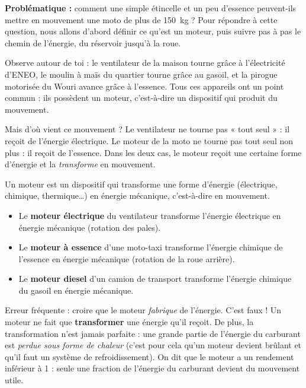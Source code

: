 \documentclass[11pt]{article}
\newcommand{\cle}[1]{{\popxbold\color{popdark}#1}}
\newcounter{popsec}
\newcounter{popsub}
\newcommand{\courssub}[1]{%
  \stepcounter{popsub}%
  \par\vspace{9pt}\noindent{\popxbold\fontsize{11.5}{13}\selectfont\color{popink}{\color{poporange}\thepopsec.\thepopsub}\hspace{6pt}#1}\par\nopagebreak\vspace{4pt}
}
\begin{document}
\textbf{Problématique :} comment une simple étincelle et un peu d'essence peuvent-ils mettre en mouvement une moto de plus de \SI{150}{kg} ? Pour répondre à cette question, nous allons d'abord définir ce qu'est un moteur, puis suivre pas à pas le chemin de l'énergie, du réservoir jusqu'à la roue.

\courssub{Qu'est-ce qu'un moteur ?}

Observe autour de toi : le ventilateur de la maison tourne grâce à l'électricité d'ENEO, le moulin à maïs du quartier tourne grâce au gasoil, et la pirogue motorisée du Wouri avance grâce à l'essence. Tous ces appareils ont un point commun : ils possèdent un \cle{moteur}, c'est-à-dire un dispositif qui produit du mouvement.

Mais d'où vient ce mouvement ? Le ventilateur ne tourne pas « tout seul » : il reçoit de l'énergie électrique. Le moteur de la moto ne tourne pas tout seul non plus : il reçoit de l'essence. Dans les deux cas, le moteur reçoit une certaine forme d'énergie et la \emph{transforme} en mouvement.

\begin{definition}[Moteur]
Un \cle{moteur} est un dispositif qui transforme une forme d'énergie (électrique, chimique, thermique\ldots) en \cle{énergie mécanique}, c'est-à-dire en mouvement.
\end{definition}

\begin{exemplebox}
\begin{itemize}
\item Le \textbf{moteur électrique} du ventilateur transforme l'énergie électrique en énergie mécanique (rotation des pales).
\item Le \textbf{moteur à essence} d'une moto-taxi transforme l'énergie chimique de l'essence en énergie mécanique (rotation de la roue arrière).
\item Le \textbf{moteur diesel} d'un camion de transport transforme l'énergie chimique du gasoil en énergie mécanique.
\end{itemize}
\end{exemplebox}

\begin{attention}
Erreur fréquente : croire que le moteur \emph{fabrique} de l'énergie. C'est faux ! Un moteur ne fait que \textbf{transformer} une énergie qu'il reçoit. De plus, la transformation n'est jamais parfaite : une grande partie de l'énergie du carburant est \emph{perdue sous forme de chaleur} (c'est pour cela qu'un moteur devient brûlant et qu'il faut un système de refroidissement). On dit que le moteur a un \cle{rendement} inférieur à 1 : seule une fraction de l'énergie du carburant devient du mouvement utile.
\end{attention}
\end{document}
